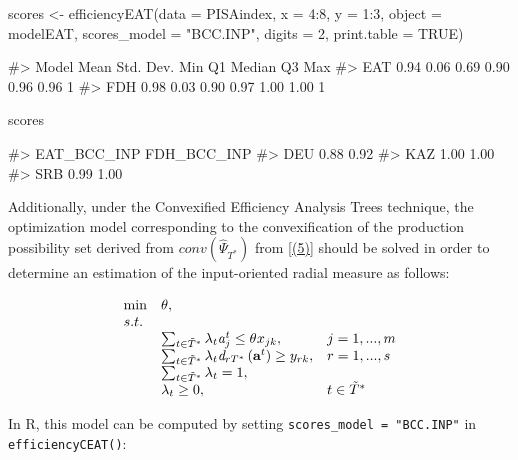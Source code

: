 \begin{Schunk}
\begin{Sinput}
scores <- efficiencyEAT(data = PISAindex, x = 4:8, y = 1:3, object = modelEAT, 
                        scores_model = "BCC.INP", digits = 2,
                        print.table = TRUE)
\end{Sinput}
\begin{Soutput}
#>  Model Mean Std. Dev.  Min   Q1 Median   Q3 Max
#>    EAT 0.94      0.06 0.69 0.90   0.96 0.96   1
#>    FDH 0.98      0.03 0.90 0.97   1.00 1.00   1
\end{Soutput}
\begin{Sinput}
scores %>% sample_n(3)
\end{Sinput}
\begin{Soutput}
#>     EAT_BCC_INP FDH_BCC_INP
#> DEU        0.88        0.92
#> KAZ        1.00        1.00
#> SRB        0.99        1.00
\end{Soutput}
\end{Schunk}

Additionally, under the Convexified Efficiency Analysis Trees technique,
the optimization model corresponding to the convexification of the
production possibility set derived from \(conv(\hat{\Psi }_{T^{*}})\)
from \eqref{(5)} should be solved in order to determine an estimation of
the input-oriented radial measure as follows:

\begin{equation} \label{(18)} 
\begin{array}{lllll} 
{} & {\min } & {\theta,} & {} & {}  \\
{} & {s.t.} & {} & {} & {} \\ 
{} & {} & {\sum_{t\in \tilde{T}^{*} }^{}\lambda_{t} {\it a}_{j}^{t}  \le \theta_{} x_{jk} ,} & {j=1,...,m} & {} \\ 
{} & {} & {\sum_{t\in \tilde{T}^{*} }^{}\lambda_{t} {\it d}_{rT^{*}} \left({\it \textbf{a}}^{t} \right) \ge y_{rk} ,} & {r=1,...,s} & {} \\ 
{} & {} & {\sum_{t\in \tilde{T}^{*} }^{}\lambda_{t}  =1,} & {} & {} \\ 
{} & {} & {\lambda _{t} \ge 0,} & {t\in \tilde{T}^{*} } & {} 
\end{array} 
\end{equation}

In R, this model can be computed by setting
\texttt{scores\_model\ =\ "BCC.INP"} in \texttt{efficiencyCEAT()}:

